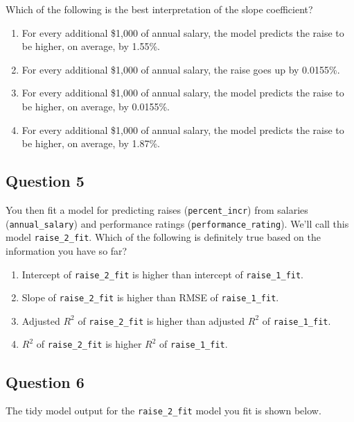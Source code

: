 \documentclass[
  letterpaper,
  DIV=11,
  numbers=noendperiod]{scrartcl}
\providecommand{\tightlist}{%
  \setlength{\itemsep}{0pt}\setlength{\parskip}{0pt}}\usepackage{longtable,booktabs,array}
\begin{document}
Which of the following is the best interpretation of the slope
coefficient?

\begin{enumerate}
\def\labelenumi{\alph{enumi}.}
\tightlist
\item
  For every additional \$1,000 of annual salary, the model predicts the
  raise to be higher, on average, by 1.55\%.
\item
  For every additional \$1,000 of annual salary, the raise goes up by
  0.0155\%.
\item
  For every additional \$1,000 of annual salary, the model predicts the
  raise to be higher, on average, by 0.0155\%.
\item
  For every additional \$1,000 of annual salary, the model predicts the
  raise to be higher, on average, by 1.87\%.
\end{enumerate}

\subsection{Question 5}\label{question-5}

You then fit a model for predicting raises (\texttt{percent\_incr}) from
salaries (\texttt{annual\_salary}) and performance ratings
(\texttt{performance\_rating}). We'll call this model
\texttt{raise\_2\_fit}. Which of the following is definitely true based
on the information you have so far?

\begin{enumerate}
\def\labelenumi{\alph{enumi}.}
\tightlist
\item
  Intercept of \texttt{raise\_2\_fit} is higher than intercept of
  \texttt{raise\_1\_fit}.
\item
  Slope of \texttt{raise\_2\_fit} is higher than RMSE of
  \texttt{raise\_1\_fit}.
\item
  Adjusted \(R^2\) of \texttt{raise\_2\_fit} is higher than adjusted
  \(R^2\) of \texttt{raise\_1\_fit}.
\item
  \(R^2\) of \texttt{raise\_2\_fit} is higher \(R^2\) of
  \texttt{raise\_1\_fit}.
\end{enumerate}

\subsection{Question 6}\label{question-6}

The tidy model output for the \texttt{raise\_2\_fit} model you fit is
shown below.
\end{document}
